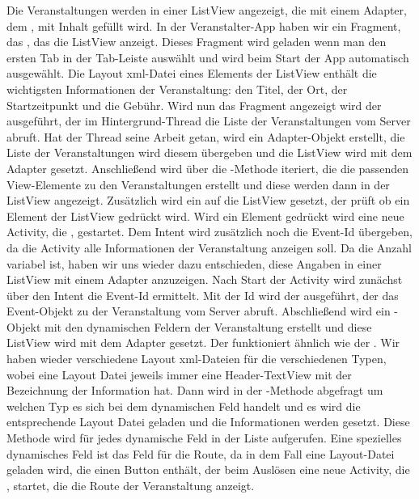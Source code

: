 Die Veranstaltungen werden in einer ListView angezeigt, die mit einem Adapter, dem , mit Inhalt gefüllt wird. In der Veranstalter-App haben wir ein Fragment, das , das die ListView anzeigt. Dieses Fragment wird geladen wenn man den ersten Tab in der Tab-Leiste auswählt und wird beim Start der App automatisch ausgewählt. Die Layout xml-Datei eines Elements der ListView enthält die wichtigsten Informationen der Veranstaltung: den Titel, der Ort, der Startzeitpunkt und die Gebühr. Wird nun das Fragment angezeigt wird der  ausgeführt, der im Hintergrund-Thread die Liste der Veranstaltungen vom Server abruft. Hat der Thread seine Arbeit getan, wird ein Adapter-Objekt erstellt, die Liste der Veranstaltungen wird diesem übergeben und die ListView wird mit dem Adapter gesetzt. Anschließend wird über die -Methode iteriert, die die passenden View-Elemente zu den Veranstaltungen erstellt und diese werden dann in der ListView angezeigt. Zusätzlich wird ein  auf die ListView gesetzt, der prüft ob ein Element der ListView gedrückt wird. Wird ein Element gedrückt wird eine neue Activity, die , gestartet. Dem Intent wird zusätzlich noch die Event-Id übergeben, da die Activity alle Informationen der Veranstaltung anzeigen soll. Da die Anzahl variabel ist, haben wir uns wieder dazu entschieden, diese Angaben in einer ListView mit einem Adapter anzuzeigen. Nach Start der Activity wird zunächst über den Intent die Event-Id ermittelt. Mit der Id wird der  ausgeführt, der das Event-Objekt zu der Veranstaltung vom Server abruft. Abschließend wird ein -Objekt mit den dynamischen Feldern der Veranstaltung erstellt und diese ListView wird mit dem Adapter gesetzt. Der  funktioniert ähnlich wie der . Wir haben wieder verschiedene Layout xml-Dateien für die verschiedenen Typen, wobei eine Layout Datei jeweils immer eine Header-TextView mit der Bezeichnung der Information hat. Dann wird in der -Methode abgefragt um welchen Typ es sich bei dem dynamischen Feld handelt und es wird die entsprechende Layout Datei geladen und die Informationen werden gesetzt. Diese Methode wird für jedes dynamische Feld in der Liste aufgerufen. Eine spezielles dynamisches Feld ist das Feld für die Route, da in dem Fall eine Layout-Datei geladen wird, die einen Button enthält, der beim Auslösen eine neue Activity, die , startet, die die Route der Veranstaltung anzeigt. 

